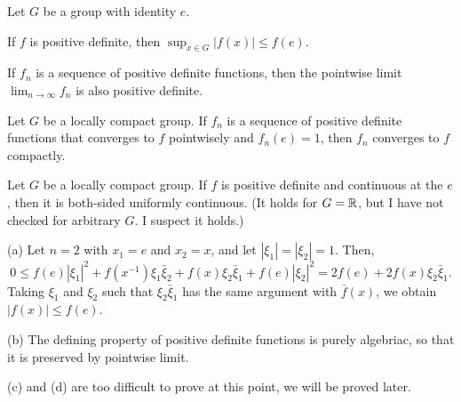 \documentclass[12pt]{article}
\begin{document}
\begin{prop}
Let $G$ be a group with identity $e$.
\begin{parts}
\item If $f$ is positive definite, then $\sup_{x\in G}|f(x)|\le f(e)$.
\item If $f_n$ is a sequence of positive definite functions, then the pointwise limit $\lim_{n\to\infty}f_n$ is also positive definite.
\item Let $G$ be a locally compact group. If $f_n$ is a sequence of positive definite functions that converges to $f$ pointwisely and $f_n(e)=1$, then $f_n$ converges to $f$ compactly.
\item Let $G$ be a locally compact group. If $f$ is positive definite and continuous at the $e$, then it is both-sided uniformly continuous. (It holds for $G=\mathbb{R}$, but I have not checked for arbitrary $G$. I suspect it holds.)
\end{parts}
\end{prop}
\begin{pf}
(a)
Let $n=2$ with $x_1=e$ and $x_2=x$, and let $|\xi_1|=|\xi_2|=1$.
Then,
\[0\le f(e)|\xi_1|^2+f(x^{-1})\xi_1\bar\xi_2+f(x)\xi_2\bar\xi_1+f(e)|\xi_2|^2=2f(e)+2f(x)\xi_2\bar\xi_1.\]
Taking $\xi_1$ and $\xi_2$ such that $\xi_2\bar\xi_1$ has the same argument with $\bar f(x)$, we obtain $|f(x)|\le f(e)$.

(b)
The defining property of positive definite functions is purely algebriac, so that it is preserved by pointwise limit.

(c) and (d) are too difficult to prove at this point, we will be proved later.
\end{pf}

\begin{ex}

\end{ex}

\bigskip
\end{document}
